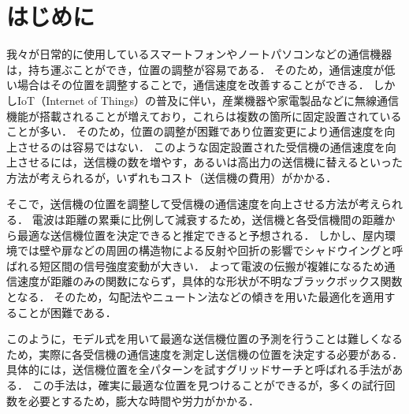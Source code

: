 \documentclass[twocolumn]{ltjarticle}
\begin{document}



\section{はじめに}
我々が日常的に使用しているスマートフォンやノートパソコンなどの通信機器は，持ち運ぶことができ，位置の調整が容易である．
そのため，通信速度が低い場合はその位置を調整することで，通信速度を改善することができる．
しかしIoT（Internet of Things）の普及に伴い，産業機器や家電製品などに無線通信機能が搭載されることが増えており，これらは複数の箇所に固定設置されていることが多い\cite{soumu}．
そのため，位置の調整が困難であり位置変更により通信速度を向上させるのは容易ではない．
このような固定設置された受信機の通信速度を向上させるには，送信機の数を増やす，あるいは高出力の送信機に替えるといった方法が考えられるが，いずれもコスト（送信機の費用）がかかる．

そこで，送信機の位置を調整して受信機の通信速度を向上させる方法が考えられる．
電波は距離の累乗に比例して減衰するため，送信機と各受信機間の距離から最適な送信機位置を決定できると推定できると予想される．
しかし、屋内環境では壁や扉などの周囲の構造物による反射や回折の影響でシャドウイングと呼ばれる短区間の信号強度変動が大きい．
よって電波の伝搬が複雑になるため通信速度が距離のみの関数にならず，具体的な形状が不明なブラックボックス関数となる．
そのため，勾配法やニュートン法などの傾きを用いた最適化を適用することが困難である．

このように，モデル式を用いて最適な送信機位置の予測を行うことは難しくなるため，実際に各受信機の通信速度を測定し送信機の位置を決定する必要がある．
具体的には，送信機位置を全パターンを試すグリッドサーチと呼ばれる手法がある．
この手法は，確実に最適な位置を見つけることができるが，多くの試行回数を必要とするため，膨大な時間や労力がかかる．
\end{document}

